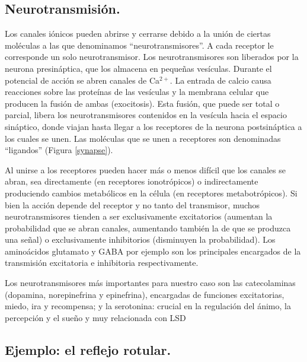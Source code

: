 \subsection{Neurotransmisión.}

Los canales iónicos pueden abrirse y cerrarse debido a la unión de ciertas moléculas a las que denominamos \enquote{neurotransmisores}. A cada receptor le corresponde un solo neurotransmisor. Los neurotransmisores son liberados por la neurona presináptica, que los almacena en pequeñas vesículas. Durante el potencial de acción se abren canales de Ca$^{2+}$. La entrada de calcio causa reacciones sobre las proteínas de las vesículas y la membrana celular que producen la fusión de ambas (exocitosis). Esta fusión, que puede ser total o parcial, libera los neurotransmisores contenidos en la vesícula hacia el espacio sináptico, donde viajan hasta llegar a los receptores de la neurona postsináptica a los cuales se unen. Las moléculas que se unen a receptores son denominadas \enquote{ligandos} (Figura \ref{synapse}).

Al unirse a los receptores pueden hacer más o menos difícil que los canales se abran, sea directamente (en receptores ionotrópicos) o indirectamente produciendo cambios metabólicos en la célula (en receptores metabotrópicos). Si bien la acción depende del receptor y no tanto del transmisor, muchos neurotransmisores tienden a ser exclusivamente excitatorios (aumentan la probabilidad que se abran canales, aumentando también la de que se produzca una señal) o exclusivamente inhibitorios (disminuyen la probabilidad). Los aminoácidos glutamato y GABA por ejemplo son los principales encargados de la transmisión excitatoria e inhibitoria respectivamente.

Los neurotransmisores más importantes para nuestro caso son las catecolaminas (dopamina, norepinefrina y epinefrina), encargadas de funciones excitatorias, miedo, ira y recompensa; y la serotonina: crucial en la regulación del ánimo, la percepción y el sueño y muy relacionada con LSD

\subsection{Ejemplo: el reflejo rotular.}

